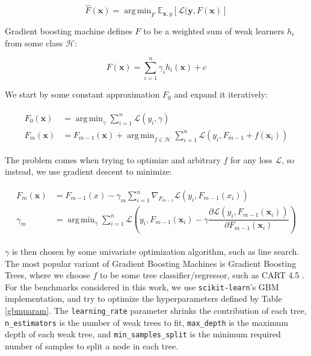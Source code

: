 \documentclass[10pt,a4paper,twoside]{book}
\DeclareMathOperator*{\argmin}{arg\,min}
\begin{document}
\begin{equation}
\hat{F}(\boldsymbol{x}) = \argmin_{F}\mathbb{E}_{\boldsymbol{x}, y}\left[ \mathcal{L}(\boldsymbol{y}, F(\boldsymbol{x})\right]
\end{equation} 

Gradient boosting machine defines $F$ to be a weighted sum of weak learners $h_i$ from some class $\mathcal{H}$:

\begin{equation}
F(\boldsymbol{x}) = \sum_{i=1}^n \gamma_i h_i(\boldsymbol{x}) + c
\end{equation}

We start by some constant approximation $F_0$ and expand it iteratively:

\begin{align}
\begin{split}
F_0(\boldsymbol{x}) &= \argmin_{\gamma} \sum_{i=1}^n \mathcal{L}(y_i, \gamma)\\
F_m(\boldsymbol{x}) &= F_{m-1}(\boldsymbol{x}) + \argmin_{f \in \mathcal{H}} \sum_{i=1}^n \mathcal{L}(y_i, F_{m-1} + f(\boldsymbol{x}_i))
\end{split}
\end{align}

The problem comes when trying to optimize and arbitrary $f$ for any loss $\mathcal{L}$, so instead, we use gradient descent to minimize:

\begin{align}
\begin{split}
F_m(\boldsymbol{x}) &= F_{m-1}(x) - \gamma_m \sum_{i=1}^n \nabla_{F_{m-1}} \mathcal{L}(y_i, F_{m-1}(x_i))\\
\gamma_m &= \argmin_{\gamma} \sum_{i=1}^n \mathcal{L}\left( y_i, F_{m-1}(\boldsymbol{x}_i) - \gamma \dfrac{\partial \mathcal{L}\left(y_i, F_{m-1}(\boldsymbol{x}_i)\right)}{\partial F_{m-1}(\boldsymbol{x}_i)} \right)
\end{split}
\end{align}

$\gamma$ is then chosen by some univariate optimization algorithm, such as line search. The most popular variant of Gradient Boosting Machines is Gradient Boosting Trees, where we choose $f$ to be some tree classifier/regressor, such as CART 4.5 \cite{Lewis2000}. For the benchmarks considered in this work, we use \texttt{scikit-learn}'s GBM implementation, and try to optimize the hyperparameters defined by Table \ref{gbmparam}. The \texttt{learning\_rate} parameter shrinks the contribution of each tree, \texttt{n\_estimators} is the number of weak trees to fit, \texttt{max\_depth} is the maximum depth of each weak tree, and \texttt{min\_samples\_split} is the minimum required number of samples to split a node in each tree.
\end{document}
